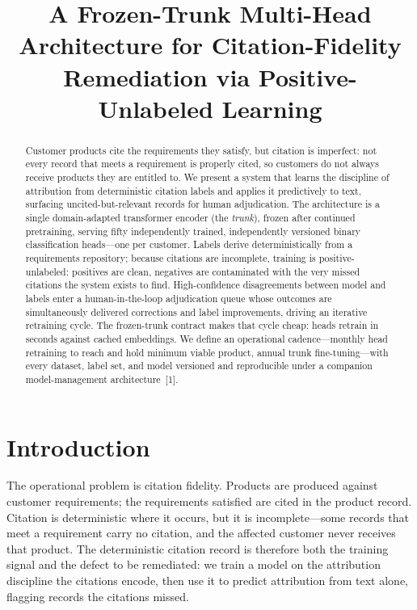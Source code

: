 \documentclass[conference]{IEEEtran}
\title{A Frozen-Trunk Multi-Head Architecture for Citation-Fidelity Remediation via Positive-Unlabeled Learning}
\author{
\IEEEauthorblockN{Johnny~Morgan}
\IEEEauthorblockA{Information Systems, UMBC\\
yj07538@umbc.edu}
}
\begin{document}
\maketitle

\begin{abstract}
Customer products cite the requirements they satisfy, but citation is imperfect: not every record that meets a requirement is properly cited, so customers do not always receive products they are entitled to. We present a system that learns the discipline of attribution from deterministic citation labels and applies it predictively to text, surfacing uncited-but-relevant records for human adjudication. The architecture is a single domain-adapted transformer encoder (the \emph{trunk}), frozen after continued pretraining, serving fifty independently trained, independently versioned binary classification heads---one per customer. Labels derive deterministically from a requirements repository; because citations are incomplete, training is positive-unlabeled: positives are clean, negatives are contaminated with the very missed citations the system exists to find. High-confidence disagreements between model and labels enter a human-in-the-loop adjudication queue whose outcomes are simultaneously delivered corrections and label improvements, driving an iterative retraining cycle. The frozen-trunk contract makes that cycle cheap: heads retrain in seconds against cached embeddings. We define an operational cadence---monthly head retraining to reach and hold minimum viable product, annual trunk fine-tuning---with every dataset, label set, and model versioned and reproducible under a companion model-management architecture~[1].
\end{abstract}

\section{Introduction}
The operational problem is citation fidelity. Products are produced against customer requirements; the requirements satisfied are cited in the product record. Citation is deterministic where it occurs, but it is incomplete---some records that meet a requirement carry no citation, and the affected customer never receives that product. The deterministic citation record is therefore both the training signal and the defect to be remediated: we train a model on the attribution discipline the citations encode, then use it to predict attribution from text alone, flagging records the citations missed.
\end{document}

